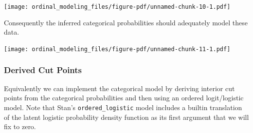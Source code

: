 \documentclass[
  letterpaper,
  DIV=11,
  numbers=noendperiod]{scrartcl}
\newenvironment{Shaded}{\begin{snugshade}}{\end{snugshade}}
\newcommand{\AttributeTok}[1]{\textcolor[rgb]{0.40,0.45,0.13}{#1}}
\newcommand{\ControlFlowTok}[1]{\textcolor[rgb]{0.00,0.23,0.31}{#1}}
\newcommand{\DecValTok}[1]{\textcolor[rgb]{0.68,0.00,0.00}{#1}}
\newcommand{\FunctionTok}[1]{\textcolor[rgb]{0.28,0.35,0.67}{#1}}
\newcommand{\NormalTok}[1]{\textcolor[rgb]{0.00,0.23,0.31}{#1}}
\newcommand{\OtherTok}[1]{\textcolor[rgb]{0.00,0.23,0.31}{#1}}
\newcommand{\SpecialCharTok}[1]{\textcolor[rgb]{0.37,0.37,0.37}{#1}}
\newcommand{\StringTok}[1]{\textcolor[rgb]{0.13,0.47,0.30}{#1}}
\begin{document}
\texttt{[image: ordinal\_modeling\_files/figure-pdf/unnamed-chunk-10-1.pdf]}

Consequently the inferred categorical probabilities should adequately
model these data.

\begin{Shaded}
\end{Shaded}

\texttt{[image: ordinal\_modeling\_files/figure-pdf/unnamed-chunk-11-1.pdf]}

\subsubsection{Derived Cut Points}\label{derived-cut-points}

Equivalently we can implement the categorical model by deriving interior
cut points from the categorical probabilities and then using an ordered
logit/logistic model. Note that Stan's \texttt{ordered\_logistic} model
includes a builtin translation of the latent logistic probability
density function as its first argument that we will fix to zero.
\end{document}
